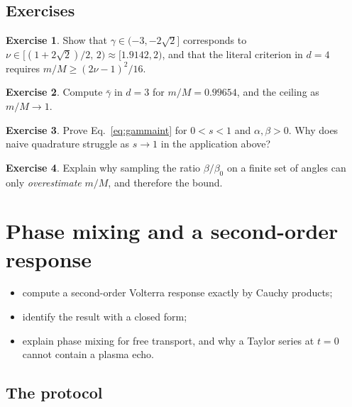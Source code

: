 \documentclass[11pt,a4paper,openany]{book}
\theoremstyle{definition}
\newtheorem{exercise}{Exercise}[chapter]
\theoremstyle{plain}
\begin{document}
\section*{Exercises}
\begin{exercise}\label{ex:nurange}
Show that $\gamma\in(-3,-2\sqrt2]$ corresponds to $\nu\in[(1+2\sqrt2)/2,\,2)\approx[1.9142,2)$, and
that the literal criterion in $d=4$ requires $m/M\ge(2\nu-1)^2/16$.
\end{exercise}
\begin{exercise}\label{ex:gammabar}
Compute $\bar\gamma$ in $d=3$ for $m/M=0.99654$, and the ceiling as $m/M\to1$.
\end{exercise}
\begin{exercise}\label{ex:gammaint}
Prove Eq.~\eqref{eq:gammaint} for $0<s<1$ and $\alpha,\beta>0$. Why does naive quadrature struggle
as $s\to1$ in the application above?
\end{exercise}
\begin{exercise}\label{ex:sampling}
Explain why sampling the ratio $\beta/\beta_0$ on a finite set of angles can only
\emph{overestimate} $m/M$, and therefore the bound.
\end{exercise}

\chapter{Phase mixing and a second-order response}
\label{ch:phasemixing}

\begin{objectives}
\begin{itemize}
  \item compute a second-order Volterra response exactly by Cauchy products;
  \item identify the result with a closed form;
  \item explain phase mixing for free transport, and why a Taylor series at $t=0$ cannot contain a
        plasma echo.
\end{itemize}
\end{objectives}

\section{The protocol}
\end{document}
